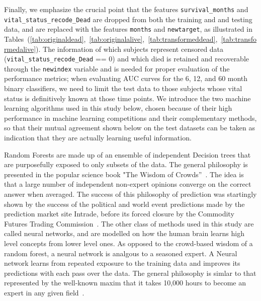 \documentclass[10pt,letterpaper]{article}
\newcommand{\codewhite}[1]{\colorbox{white}{\texttt{#1}}}
\begin{document}
Finally, we emphasize the crucial point that the features \codewhite{survival\_months} and \\
\codewhite{vital\_status\_recode\_Dead} are dropped from both the training and and testing data, and are replaced with the features \codewhite{months} and \codewhite{newtarget}, as illustrated in Tables~(\ref{tab:originaldead},~\ref{tab:originalalive},~\ref{tab:transformeddead},~\ref{tab:transformedalive}). The information of which subjects represent censored data (\codewhite{vital\_status\_recode\_Dead} == 0) and which died is retained and recoverable through the \codewhite{newindex} variable and is needed for proper evaluation of the performance metrics; when evaluating AUC curves for the 6, 12, and 60 month binary classifiers, we need to limit the test data to those subjects
whose vital status is definitively known at those time points.
We introduce the two machine learning algorithms used in this study below, chosen because of their high performance in machine learning competitions and their complementary methods, so that their mutual agreement shown below on the test datasets can be taken as indication that they are actually learning useful information.


Random Forests are made up of an ensemble of independent Decision trees that are purposefully exposed to only subsets of the data. The general philosophy is presented in the popular science book "The Wisdom of Crowds''~\cite{wisdom}.
The idea is that a large number of independent non-expert opinions converge on the correct answer when averaged. The success of this philosophy of prediction was startingly shown by the success of the political and world event predictions made by the prediction market site Intrade, before its forced closure by the Commodity Futures Trading Commission~\cite{cassidy}. %
 The other class of methods used in this study are called neural networks, and are modelled on how the human brain learns high level concepts from lower level ones. 
As opposed to the crowd-based wisdom of a random forest, a neural network is analgous to a seasoned expert. 
A Neural network learns from repeated exposure to the training data and improves its predictions with each pass over the data.
 The general philosophy is simlar to that represented by the well-known maxim that it takes 10,000 hours to become an expert in any given field~\cite{outliers}.
\end{document}
